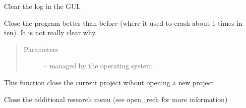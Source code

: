 \documentclass[letterpaper,10pt,english]{sphinxmanual}
\begin{document}
\begin{fulllineitems}
\begin{fulllineitems}
\end{fulllineitems}


\begin{fulllineitems}
\label{\detokenize{index:src_GUI.Main_windows_1.MainWindows.clear_log}}
Clear the log in the GUI.

\end{fulllineitems}


\begin{fulllineitems}
\label{\detokenize{index:src_GUI.Main_windows_1.MainWindows.closeEvent}}
Close the program better than before (where it used to crash about 1 times in ten). It is not really clear why.
\begin{quote}\begin{description}
\item[{Parameters}] \leavevmode
{} -- managed by the operating system.

\end{description}\end{quote}

\end{fulllineitems}


\begin{fulllineitems}
\label{\detokenize{index:src_GUI.Main_windows_1.MainWindows.close_project}}
This function close the current project wihout opening a new project

\end{fulllineitems}


\begin{fulllineitems}
\label{\detokenize{index:src_GUI.Main_windows_1.MainWindows.close_rech}}
Close the additional research menu (see open\_rech for more information)

\end{fulllineitems}


\end{fulllineitems}
\end{document}
